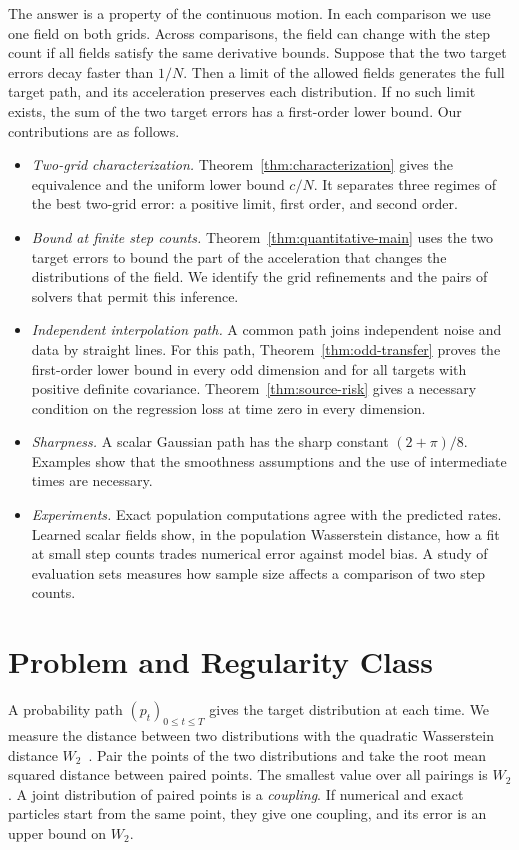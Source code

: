 The answer is a property of the continuous motion. In each comparison we
use one field on both grids. Across comparisons, the field can change
with the step count if all fields satisfy the same derivative bounds. Suppose
that the two target errors decay faster than $1/N$. Then a limit of the
allowed fields generates the full target path, and its acceleration
preserves each distribution. If no such limit exists, the sum of the two target
errors has a first-order lower bound. Our contributions are as follows.
\begin{itemize}
\item \emph{Two-grid characterization.} Theorem~\ref{thm:characterization}
gives the equivalence and the uniform lower bound $c/N$. It separates
three regimes of the best two-grid error: a positive limit, first order,
and second order.
\item \emph{Bound at finite step counts.} Theorem~\ref{thm:quantitative-main}
uses the two target errors to bound the part of the acceleration that
changes the distributions of the field. We identify the grid refinements
and the pairs of solvers that permit this inference.
\item \emph{Independent interpolation path.} A common path joins
independent noise and data by straight lines. For this path,
Theorem~\ref{thm:odd-transfer} proves the first-order lower bound in
every odd dimension and for all targets with positive definite
covariance. Theorem~\ref{thm:source-risk}
gives a necessary condition on the regression loss at time zero in every
dimension.
\item \emph{Sharpness.} A scalar Gaussian path has the sharp constant
$(2+\pi)/8$. Examples show that the smoothness assumptions and the use
of intermediate times are necessary.
\item \emph{Experiments.} Exact population computations agree with the
predicted rates. Learned scalar fields show, in the population
Wasserstein distance, how a fit at small step counts trades numerical
error against model bias. A study of \VarSetCount{} evaluation sets measures how sample size
affects a comparison of two step counts.
\end{itemize}



\section{Problem and Regularity Class}
\label{sec:setting}
A probability path $(p_t)_{0\le t\le T}$ gives the target distribution
at each time. We measure the distance between two distributions with the
quadratic Wasserstein distance $W_2$~\citep{villani2009optimal}. Pair
the points of the two distributions and take the root mean squared
distance between paired points. The smallest value over all pairings is
$W_2$. A joint distribution of paired points is a \emph{coupling}. If
numerical and exact particles start from the same point, they give one
coupling, and its error is an upper bound on $W_2$.\AIassistance


